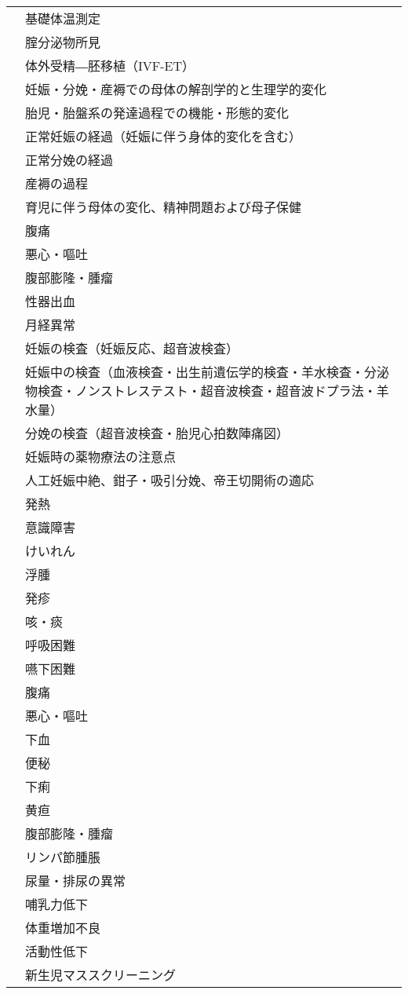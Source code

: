 \begin{xltabular}{\linewidth}{XX}
 & 基礎体温測定 \\
 & 腟分泌物所見 \\
 & 体外受精―胚移植（IVF-ET） \\
 & 妊娠・分娩・産褥での母体の解剖学的と生理学的変化 \\
 & 胎児・胎盤系の発達過程での機能・形態的変化 \\
 & 正常妊娠の経過（妊娠に伴う身体的変化を含む） \\
 & 正常分娩の経過 \\
 & 産褥の過程 \\
 & 育児に伴う母体の変化、精神問題および母子保健 \\
 & 腹痛 \\
 & 悪心・嘔吐 \\
 & 腹部膨隆・腫瘤 \\
 & 性器出血 \\
 & 月経異常 \\
 & 妊娠の検査（妊娠反応、超音波検査） \\
 & 妊娠中の検査（血液検査・出生前遺伝学的検査・羊水検査・分泌物検査・ノンストレステスト・超音波検査・超音波ドプラ法・羊水量） \\
 & 分娩の検査（超音波検査・胎児心拍数陣痛図） \\
 & 妊娠時の薬物療法の注意点 \\
 & 人工妊娠中絶、鉗子・吸引分娩、帝王切開術の適応 \\
 & 発熱 \\
 & 意識障害 \\
 & けいれん \\
 & 浮腫 \\
 & 発疹 \\
 & 咳・痰 \\
 & 呼吸困難 \\
 & 嚥下困難 \\
 & 腹痛 \\
 & 悪心・嘔吐 \\
 & 下血 \\
 & 便秘 \\
 & 下痢 \\
 & 黄疸 \\
 & 腹部膨隆・腫瘤 \\
 & リンパ節腫脹 \\
 & 尿量・排尿の異常 \\
 & 哺乳力低下 \\
 & 体重増加不良 \\
 & 活動性低下 \\
 & 新生児マススクリーニング \\

\end{xltabular}
